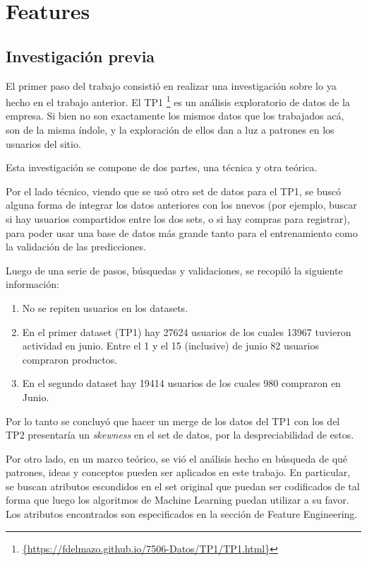 \documentclass[a4paper]{article}
\begin{document}
\section{Features}
\subsection{Investigación previa}

El primer paso del trabajo consistió en realizar una investigación sobre lo ya hecho en el trabajo anterior. El TP1 \footnote{\url{{https://fdelmazo.github.io/7506-Datos/TP1/TP1.html}}} es un análisis exploratorio de datos de la empresa. Si bien no son exactamente los mismos datos que los trabajados acá, son de la misma índole, y la exploración de ellos dan a luz a patrones en los usuarios del sitio.

Esta investigación se compone de dos partes, una técnica y otra teórica.

Por el lado técnico, viendo que se usó otro set de datos para el TP1, se buscó alguna forma de integrar los datos anteriores con los nuevos (por ejemplo, buscar si hay usuarios compartidos entre los dos sets, o si hay compras para registrar), para poder usar una base de datos más grande tanto para el entrenamiento como la validación de las predicciones. 

Luego de una serie de pasos, búsquedas y validaciones, se recopiló la siguiente información:
\begin{enumerate}
\item No se repiten usuarios en los datasets.
\item En el primer dataset (TP1) hay 27624 usuarios de los cuales 13967 tuvieron actividad en junio. Entre el 1 y el 15 (inclusive) de junio 82 usuarios compraron productos.
\item En el segundo dataset hay 19414 usuarios de los cuales 980 compraron en Junio.
\end{enumerate}

Por lo tanto se concluyó que hacer un merge de los datos del TP1 con los del TP2 presentaría un \textit{skewness} en el set de datos, por la despreciabilidad de estos.

Por otro lado, en un marco teórico, se vió el análisis hecho en búsqueda de qué patrones, ideas y conceptos pueden ser aplicados en este trabajo. En particular, se buscan atributos escondidos en el set original que puedan ser codificados de tal forma que luego los algoritmos de Machine Learning puedan utilizar a su favor. Los atributos encontrados son especificados en la sección de Feature Engineering.
\end{document}
